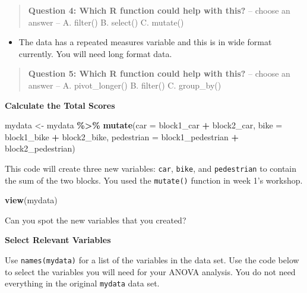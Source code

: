 \documentclass[
]{book}
\newenvironment{Shaded}{\begin{snugshade}}{\end{snugshade}}
\newcommand{\AttributeTok}[1]{\textcolor[rgb]{0.13,0.29,0.53}{#1}}
\newcommand{\FunctionTok}[1]{\textcolor[rgb]{0.13,0.29,0.53}{\textbf{#1}}}
\newcommand{\NormalTok}[1]{#1}
\newcommand{\OtherTok}[1]{\textcolor[rgb]{0.56,0.35,0.01}{#1}}
\newcommand{\SpecialCharTok}[1]{\textcolor[rgb]{0.81,0.36,0.00}{\textbf{#1}}}
\providecommand{\tightlist}{%
  \setlength{\itemsep}{0pt}\setlength{\parskip}{0pt}}
\begin{document}
\begin{quote}
\textbf{Question 4: Which R function could help with this?} -- choose an answer -- A. filter() B. select() C. mutate()
\end{quote}

\begin{itemize}
\tightlist
\item
  The data has a repeated measures variable and this is in wide format currently. You will need long format data.
\end{itemize}

\begin{quote}
\textbf{Question 5: Which R function could help with this?} -- choose an answer -- A. pivot\_longer() B. filter() C. group\_by()
\end{quote}

\textbf{Calculate the Total Scores}

\begin{Shaded}
\begin{Highlighting}[]
\NormalTok{mydata }\OtherTok{\textless{}{-}}\NormalTok{ mydata }\SpecialCharTok{\%\textgreater{}\%}
  \FunctionTok{mutate}\NormalTok{(}\AttributeTok{car =}\NormalTok{ block1\_car }\SpecialCharTok{+}\NormalTok{ block2\_car,}
         \AttributeTok{bike =}\NormalTok{ block1\_bike }\SpecialCharTok{+}\NormalTok{ block2\_bike,}
         \AttributeTok{pedestrian =}\NormalTok{ block1\_pedestrian }\SpecialCharTok{+}\NormalTok{ block2\_pedestrian)}
\end{Highlighting}
\end{Shaded}

This code will create three new variables: \texttt{car}, \texttt{bike}, and \texttt{pedestrian} to contain the sum of the two blocks. You used the \texttt{mutate()} function in week 1's workshop.

\begin{Shaded}
\begin{Highlighting}[]
\FunctionTok{view}\NormalTok{(mydata)}
\end{Highlighting}
\end{Shaded}

Can you spot the new variables that you created?

\textbf{Select Relevant Variables}

Use \texttt{names(mydata)} for a list of the variables in the data set. Use the code below to select the variables you will need for your ANOVA analysis. You do not need everything in the original \texttt{mydata} data set.
\end{document}
